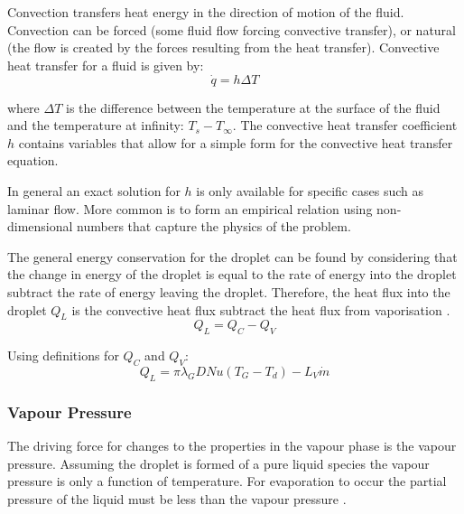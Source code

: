 \documentclass[../Interim_Report_Master]{subfiles}
\begin{document}
Convection transfers heat energy in the direction of motion of the fluid. Convection can be forced (some fluid flow forcing convective transfer), or natural (the flow is created by the forces resulting from the heat transfer). Convective heat transfer for a fluid is given by:
\begin{equation}
\dot{q} = h\Delta T
\end{equation}

where $\Delta T$ is the difference between the temperature at the surface of the fluid and the temperature at infinity: $T_s-T_{\infty}$. The convective heat transfer coefficient $h$ contains variables that allow for a simple form for the convective heat transfer equation.\cite{Shrimpton2015}

In general an exact solution for $h$ is only available for specific cases such as laminar flow. More common is to form an empirical relation using non-dimensional numbers that capture the physics of the problem. \cite{Deiterding20192}

The general energy conservation for the droplet can be found by considering that the change in energy of the droplet is equal to the rate of energy into the droplet subtract the rate of energy leaving the droplet. Therefore, the heat flux into the droplet $Q_L$ is the convective heat flux subtract the heat flux from vaporisation \cite{depredurand_castanet_lemoine_2010}. 
\begin{equation}
Q_L = Q_C - Q_V
\end{equation}

Using definitions for $Q_C$ and $Q_V$:
\begin{equation}
Q_L = \pi \lambda_G D Nu(T_G - T_d) - L_V\dot{m}
\end{equation}

\subsubsection{Vapour Pressure}
The driving force for changes to the properties in the vapour phase is the vapour pressure. Assuming the droplet is formed of a pure liquid species the vapour pressure is only a function of temperature. For evaporation to occur the partial pressure of the liquid must be less than the vapour pressure \cite{Nazaroff2001}. 
\end{document}
